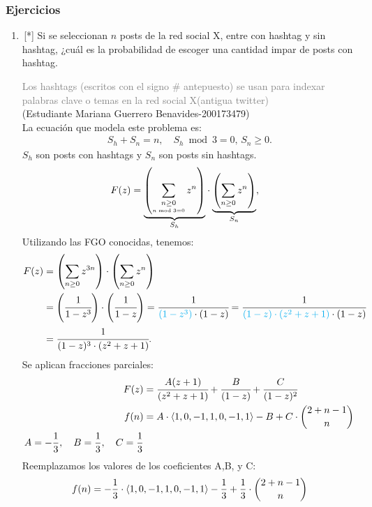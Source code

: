 \subsubsection*{Ejercicios}
\begin{enumerate}
\item \,[*] Si se seleccionan $n$ posts de  la red social X, entre  con hashtag y   sin hashtag, ¿cuál es la probabilidad de escoger una cantidad impar  de posts con hashtag.

\textcolor{gray}{Los hashtags (escritos con el signo $\#$ antepuesto) se usan para indexar palabras clave o temas en la red social X(antigua twitter)}\\
(Estudiante Mariana Guerrero Benavides-200173479)\\
La ecuación que modela este problema es:
\begin{align*}
S_h + S_n = n,\quad S_h\bmod 3=0,\, S_n\geq0.
\end{align*}
$S_h$ son posts con hashtags y $S_n$ son posts sin hashtags.\\
\begin{align*}
F(z)&=\underset{S_h}{\underbrace{\left(\sum_{\underset{n\bmod 3=0}{n\geq0}}z^n\right)}}\cdot\underset{S_n}{\underbrace{\left(\sum_{n\geq0}z^n\right)}},
\end{align*}
Utilizando las FGO conocidas, tenemos:
\begin{align*}
F(z)&=\left(\sum_{n\geq0}z^{3n}\right)\cdot\left(\sum_{n\geq 0}z^n\right)\\
&=\left(\cfrac{1}{1-z^3}\right)\cdot\left(\cfrac{1}{1-z}\right)=\cfrac{1}{{\color{cyan}(1-z^3)}\cdot(1-z)}=\cfrac{1}{{\color{cyan}(1-z)\cdot(z^2 + z + 1)}\cdot(1-z)}\\
&=\cfrac{1}{(1-z)^3\cdot(z^2+z+1)}.
\end{align*}
Se aplican fracciones parciales: \\
\begin{align*}
F(z)&=\cfrac{A(z+1)}{(z^2 + z + 1)}+\cfrac{B}{(1-z)}+\cfrac{C}{(1-z)^2}\\
f(n) &= A \cdot \langle 1,0,-1,1,0,-1,1\rangle - B + C \cdot \dbinom{2 + n -1}{n}\\
A= -\dfrac{1}{3}, \quad B=\dfrac{1}{3}, \quad C=\dfrac{1}{3}
\end{align*}
Reemplazamos los valores de los coeficientes A,B, y C:\\
\begin{align*}
    f(n) &= -\dfrac{1}{3} \cdot \langle 1,0,-1,1,0,-1,1\rangle - \dfrac{1}{3} + \dfrac{1}{3} \cdot \dbinom{2 + n -1}{n}\\

\end{align*}
\end{enumerate}
